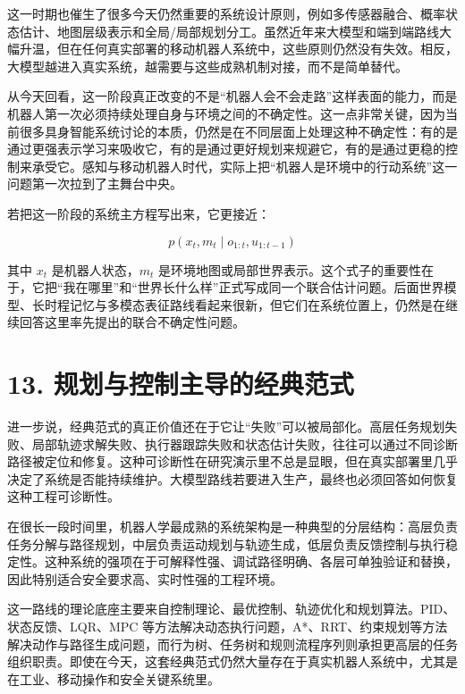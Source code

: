 这一时期也催生了很多今天仍然重要的系统设计原则，例如多传感器融合、概率状态估计、地图层级表示和全局/局部规划分工。虽然近年来大模型和端到端路线大幅升温，但在任何真实部署的移动机器人系统中，这些原则仍然没有失效。相反，大模型越进入真实系统，越需要与这些成熟机制对接，而不是简单替代。

从今天回看，这一阶段真正改变的不是“机器人会不会走路”这样表面的能力，而是机器人第一次必须持续处理自身与环境之间的不确定性。这一点非常关键，因为当前很多具身智能系统讨论的本质，仍然是在不同层面上处理这种不确定性：有的是通过更强表示学习来吸收它，有的是通过更好规划来规避它，有的是通过更稳的控制来承受它。感知与移动机器人时代，实际上把“机器人是环境中的行动系统”这一问题第一次拉到了主舞台中央。

若把这一阶段的系统主方程写出来，它更接近：

\begin{equation*}
p(x_t, m_t \mid o_{1:t}, u_{1:t-1})
\end{equation*}

其中 \(x_t\) 是机器人状态，\(m_t\) 是环境地图或局部世界表示。这个式子的重要性在于，它把“我在哪里”和“世界长什么样”正式写成同一个联合估计问题。后面世界模型、长时程记忆与多模态表征路线看起来很新，但它们在系统位置上，仍然是在继续回答这里率先提出的联合不确定性问题。

\section*{13. 规划与控制主导的经典范式}

进一步说，经典范式的真正价值还在于它让“失败”可以被局部化。高层任务规划失败、局部轨迹求解失败、执行器跟踪失败和状态估计失败，往往可以通过不同诊断路径被定位和修复。这种可诊断性在研究演示里不总是显眼，但在真实部署里几乎决定了系统是否能持续维护。大模型路线若要进入生产，最终也必须回答如何恢复这种工程可诊断性。

在很长一段时间里，机器人学最成熟的系统架构是一种典型的分层结构：高层负责任务分解与路径规划，中层负责运动规划与轨迹生成，低层负责反馈控制与执行稳定性。这种系统的强项在于可解释性强、调试路径明确、各层可单独验证和替换，因此特别适合安全要求高、实时性强的工程环境。

这一路线的理论底座主要来自控制理论、最优控制、轨迹优化和规划算法。PID、状态反馈、LQR、MPC 等方法解决动态执行问题，A*、RRT、约束规划等方法解决动作与路径生成问题，而行为树、任务树和规则流程序列则承担更高层的任务组织职责。即使在今天，这套经典范式仍然大量存在于真实机器人系统中，尤其是在工业、移动操作和安全关键系统里。


